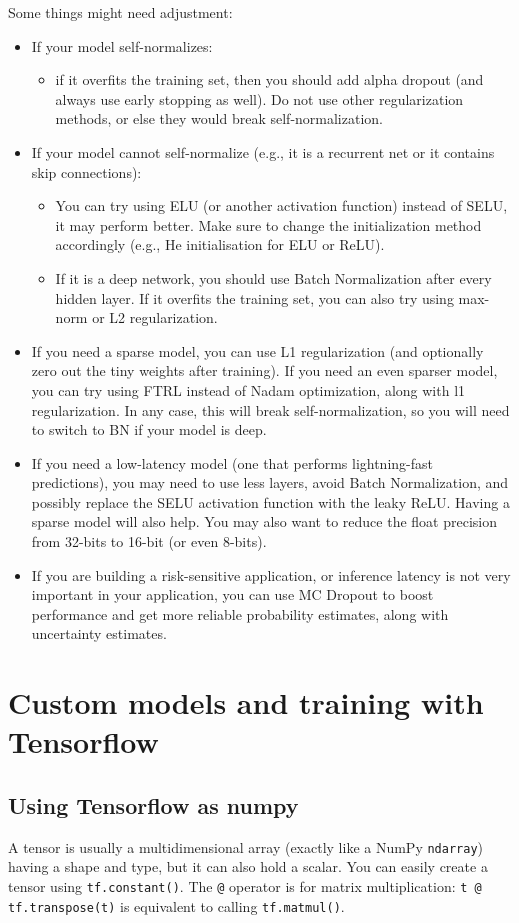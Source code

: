 \documentclass[12pt, letterpaper]{article}
\theoremstyle{definition}
\let\cd\lstinline
\begin{document}
Some things might need adjustment:
\begin{itemize}
\item If your model self-normalizes:
	\begin{itemize}
		\item if it overfits the training set, then you should add alpha dropout (and always use early stopping as well). Do not use other regularization methods, or else they would break self-normalization.
	\end{itemize}
\item If your model cannot self-normalize (e.g., it is a recurrent net or it contains skip connections):
\begin{itemize}
\item You can try using ELU (or another activation function) instead of SELU, it may perform better. Make sure to change the initialization method accordingly (e.g., He initialisation for ELU or ReLU).
\item If it is a deep network, you should use Batch Normalization after every hidden layer. If it overfits the training set, you can also try using max-norm or L2 regularization.
\end{itemize}
\item If you need a sparse model, you can use L1 regularization (and optionally zero out the tiny weights after training). If you need an even sparser model, you can try using FTRL instead of Nadam optimization, along with l1 regularization. In any case, this will break self-normalization, so you will need to switch to BN if your model is deep.
\item If you need a low-latency model (one that performs lightning-fast predictions), you may need to use less layers, avoid Batch Normalization, and possibly replace the SELU activation function with the leaky ReLU. Having a sparse model will also help. You may also want to reduce the float precision from 32-bits to 16-bit (or even 8-bits).
\item If you are building a risk-sensitive application, or inference latency is not very important in your application, you can use MC Dropout to boost performance and get more reliable probability estimates, along with uncertainty estimates.
\end{itemize}
\printindex
\section{Custom models and training with Tensorflow}
\subsection{Using Tensorflow as numpy}
A tensor is usually a multidimensional array (exactly like a NumPy \cd+ndarray+) having a shape and type, but it can also hold a scalar. You can easily create a tensor using \cd+tf.constant()+. The \cd+@+ operator is for matrix multiplication: \cd+t @ tf.transpose(t)+ is equivalent to calling \cd+tf.matmul()+.
\end{document}
